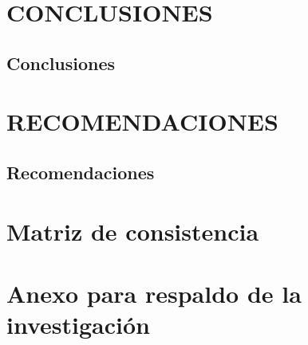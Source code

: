 \documentclass[12pt,a4paper,oneside]{report}
\begin{document}
\chapter{ CONCLUSIONES}

\section{Conclusiones}



\chapter{\hspace{0.23cm}RECOMENDACIONES}

\section{Recomendaciones}


\renewcommand*{\bibname}{REFERENCIAS}
\newpage



\appendix
\clearpage
\addappheadtotoc
\appendixpage

\chapter{Matriz de consistencia}

\chapter{Anexo para respaldo de la investigación}
\end{document}
